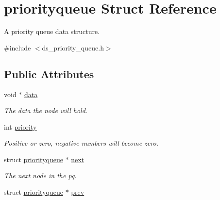 \hypertarget{structpriorityqueue}{}\section{priorityqueue Struct Reference}
\label{structpriorityqueue}


A priority queue data structure.  




{\ttfamily \#include $<$ds\+\_\+priority\+\_\+queue.\+h$>$}

\subsection*{Public Attributes}
\begin{DoxyCompactItemize}
\item 
\mbox{\label{structpriorityqueue_affe7fb8b93bc48a1832a57dc3024ca18}} 
void $\ast$ \hyperlink{structpriorityqueue_affe7fb8b93bc48a1832a57dc3024ca18}{data}
\begin{DoxyCompactList}\small\item\em The data the node will hold. \end{DoxyCompactList}\item 
\mbox{\label{structpriorityqueue_a349fcacd1ebd0edd1ba3413122f6254c}} 
int \hyperlink{structpriorityqueue_a349fcacd1ebd0edd1ba3413122f6254c}{priority}
\begin{DoxyCompactList}\small\item\em Positive or zero, negative numbers will become zero. \end{DoxyCompactList}\item 
\mbox{\label{structpriorityqueue_abaf4935fa63491b0098d5aa4b3ef87e1}} 
struct \hyperlink{structpriorityqueue}{priorityqueue} $\ast$ \hyperlink{structpriorityqueue_abaf4935fa63491b0098d5aa4b3ef87e1}{next}
\begin{DoxyCompactList}\small\item\em The next node in the pq. \end{DoxyCompactList}\item 
\mbox{\label{structpriorityqueue_aef9c71eba1e02a3d5ed92e0ecec39e79}} 
struct \hyperlink{structpriorityqueue}{priorityqueue} $\ast$ \hyperlink{structpriorityqueue_aef9c71eba1e02a3d5ed92e0ecec39e79}{prev}

\end{DoxyCompactItemize}
